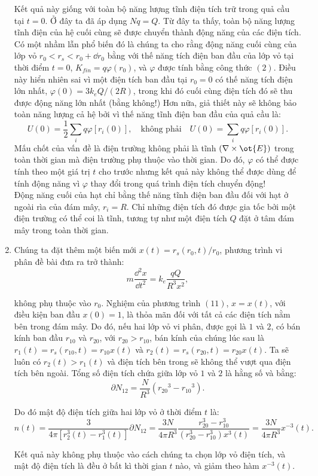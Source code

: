 \begin{loigiai}
\begin{enumerate}[1)]
Kết quả này giống với toàn bộ năng lượng tĩnh điện tích trữ trong quả cầu tại $t=0$. Ở đây ta đã áp dụng $Nq=Q$. Từ đây ta thấy, toàn bộ năng lượng tĩnh điện của hệ cuối cùng sẽ được chuyển thành động năng của các điện tích.\\
Có một nhầm lẫn phổ biến đó là chúng ta cho rằng động năng cuối cùng của lớp vỏ $r_0<r_s<r_0 + \dd r_0$ bằng với thế năng tích điện ban đầu của lớp vỏ tại thời điểm $t=0$, 
$K_{fin} = q\varphi (r_0)$, và $\varphi$ được tính bằng công thức $(2)$. Điều này hiển nhiên sai vì một điện tích ban đầu tại $r_0=0$ có thế năng tích điện lớn nhất, $\varphi(0) = 3 k_e Q/ (2R)$, trong khi đó cuối cùng điện tích đó sẽ thu được động năng lớn nhất (bằng không!) Hơn nữa, giả thiết này sẽ không bảo toàn năng lượng cả hệ bởi vì thế năng tĩnh điện ban đầu của quả cầu là:
         $$U(0) = \frac{1}{2}\sum_{i} q\varphi [r_i (0)], \quad \text{không phải} \quad U(0)= \sum_{i} q \varphi [r_i(0)].$$
Mấu chốt của vấn đề là điện trường không phải là tĩnh $(\nabla\times \ot{E})$ trong toàn thời gian mà điện trường phụ thuộc vào thời gian. Do đó, $\varphi$ có thể được tính theo một giá trị $t$ cho trước nhưng kết quả này không thể được dùng để tính động năng vì $\varphi$ thay đổi trong quá trình điện tích chuyển động!\\
Động năng cuối của hạt chỉ bằng thế năng tĩnh điện ban đầu đối với hạt ở ngoài rìa của đám mây, $r_i = R$. Chỉ những điện tích đó được gia tốc bởi một điện trường có thể coi là tĩnh, tương tự như một điện tích $Q$ đặt ở tâm đám mây trong toàn thời gian.
  \item Chúng ta đặt thêm một biến mới $x(t)= r_s (r_0,t)/r_0$, phương trình vi phân đề bài đưa ra trở thành:
    \[ m\dfrac{\dd^2 x}{\dd t^2}= k_e \dfrac{qQ}{R^3x^2}, \tag{11}\]

không phụ thuộc vào $r_0$. Nghiệm của phương trình $(11)$, $x=x(t)$, với điều kiện ban đầu $x(0) =1$, là thỏa mãn đối với tất cả các điện tích nằm bên trong đám mây. Do đó, nếu hai lớp vỏ vi phân, được gọi là $1$ và $2$, có bán kính ban đầu $r_{10}$ và $r_{20}$, với $r_{20}> r_{10}$, bán kính của chúng lúc sau là $r_1(t) = r_s(r_{10},t) = r_{10} x(t)$ và $r_2(t) = r_s(r_{20},t) = r_{20} x(t)$. Ta sẽ luôn có $r_2(t)> r_1(t)$ và điện tích bên trong sẽ không thể vượt qua điện tích bên ngoài. Tổng số điện tích chứa giữa lớp vỏ $1$ và $2$ là hằng số và bằng:
     \[\partial N_{12} = \dfrac{N}{R^3} ({r_{20}}^3 - {r_{10}}^3). \tag{12} \]

Do đó mật độ điện tích giữa hai lớp vỏ ở thời điểm $t$ là:
   \[n(t) = \dfrac{3}{4\pi\left[r_2^3(t) - r_1^3(t)\right]}\partial N_{12} = \dfrac{3N}{4\pi R^3} \dfrac{r_{20}^3 - r_{10}^3}{(r_{20}^3 -r_{10}^3)x^3(t)} = \dfrac{3N}{4\pi R^3}x^{-3}(t). \tag{13} \]

Kết quả này không phụ thuộc vào cách chúng ta chọn lớp vỏ điện tích, và mật độ điện tích là đều ở bất kì thời gian $t$ nào, và giảm theo hàm $x^{-3}(t).$
\end{enumerate}
\end{loigiai}


